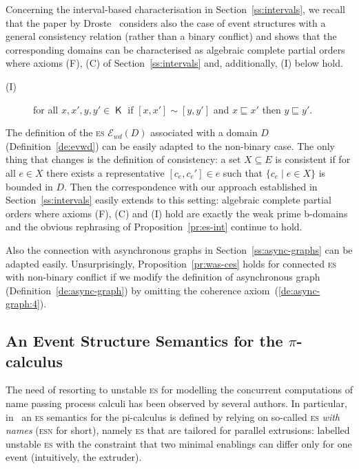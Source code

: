 \documentclass[conference]{IEEEtran}
\newcommand{\compact}[1]{\ensuremath{\mathop{\mathsf{K}({#1})}}}
\newcommand{\esabbr}{\textsc{es}}
\newcommand{\esnmabbr}{\textsc{esn}}
\newcommand{\zevwd}[0]{\ensuremath{\mathcal{E}_{wd}}}
\newcommand{\evwd}[1]{\ensuremath{\zevwd({#1})}}
\newcommand{\dint}[2]{\ensuremath{[{#1},{#2}]}}
\begin{document}
Concerning the interval-based characterisation in
Section~\ref{ss:intervals}, we recall that the paper by
Droste~\cite{Dro:ESD} considers also the case of event structures with
a general consistency relation (rather than a binary conflict) and
shows that the corresponding domains can be characterised as
algebraic complete partial orders where
axioms (F), (C) of Section~\ref{ss:intervals} and, additionally, (I) below hold.

\begin{description}
\item[(I)] for all $x,x',y,y' \in \compact{D}$ if $\dint{x}{x'} \sim \dint{y}{y'}$
  and $x \sqsubseteq x'$ then $y \sqsubseteq y'$.
\end{description}

The definition of the {\esabbr} $\evwd{D}$ associated with a domain $D$
(Definition~\ref{de:evwd}) can be easily adapted to the non-binary
case. The only thing that changes is the definition of
consistency: a set $X \subseteq E$ is consistent if for all $e \in X$
there exists a representative $\dint{c_e}{c_e'} \in e$ such that
$\{ c_e \mid e \in X \}$ is bounded in $D$.
%
Then the correspondence with our approach established in
Section~\ref{ss:intervals} easily extends to this setting: algebraic
complete partial orders where axioms (F), (C) and (I) hold are exactly
the weak prime b-domains and the obvious rephrasing of
Proposition~\ref{pr:es-int} continue to hold.

Also the connection with asynchronous graphs in
Section~\ref{ss:async-graphs} can be adapted easily. Unsurprisingly,
Proposition~\ref{pr:was-ces} holds for connected {\esabbr} with
non-binary conflict if we modify the definition of asynchronous graph
(Definition~\ref{de:async-graph}) by omitting the coherence
axiom~(\ref{de:async-graph:4}).
 



%
%

\subsection{An Event Structure Semantics for the $\pi$-calculus}
\label{app:pi}


The need of resorting to unstable {\esabbr} for modelling the
concurrent computations of name passing process calculi has been
observed by several authors. In particular, in~\cite{CVY:ESSPE} an
{\esabbr} semantics for the pi-calculus is defined by relying on
so-called {\esabbr} \emph{with names} ({\esnmabbr} for short), namely
{\esabbr} that are tailored for parallel extrusions: labelled unstable
{\esabbr} with the constraint that two minimal enablings can differ
only for one event (intuitively, the extruder).
\end{document}
